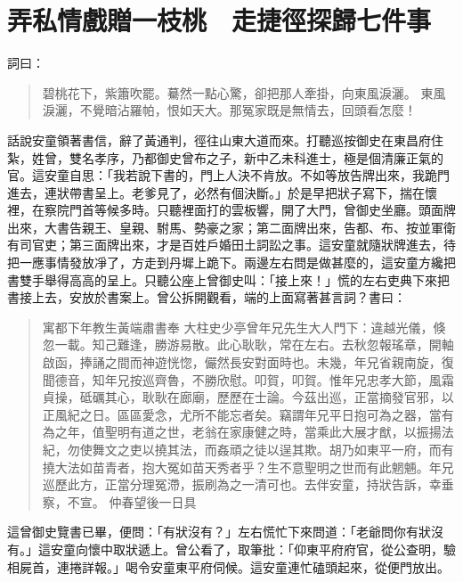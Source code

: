
\chapter{弄私情戲贈一枝桃　走捷徑探歸七件事}

詞曰：
\begin{quote}
碧桃花下，紫簫吹罷。驀然一點心驚，卻把那人牽掛，向東風淚灑。
東風淚灑，不覺暗沾羅帕，恨如天大。那冤家既是無情去，回頭看怎麼！
\end{quote}

話說安童領著書信，辭了黃通判，徑往山東大道而來。打聽巡按御史在東昌府住紮，姓曾，雙名孝序，乃都御史曾布之子，新中乙未科進士，極是個清廉正氣的官。這安童自思：「我若說下書的，門上人決不肯放。不如等放告牌出來，我跪門進去，連狀帶書呈上。老爹見了，必然有個決斷。」於是早把狀子寫下，揣在懷裡，在察院門首等候多時。只聽裡面打的雲板響，開了大門，曾御史坐廳。頭面牌出來，大書告親王、皇親、駙馬、勢豪之家；第二面牌出來，告都、布、按並軍衛有司官吏；第三面牌出來，才是百姓戶婚田土詞訟之事。這安童就隨狀牌進去，待把一應事情發放凈了，方走到丹墀上跪下。兩邊左右問是做甚麼的，這安童方纔把書雙手舉得高高的呈上。只聽公座上曾御史叫：「接上來！」慌的左右吏典下來把書接上去，安放於書案上。曾公拆開觀看，端的上面寫著甚言詞？書曰：
\begin{quote}
寓都下年教生黃端肅書奉
大柱史少亭曾年兄先生大人門下：違越光儀，倏忽一載。知己難逢，勝游易散。此心耿耿，常在左右。去秋忽報瑤章，開軸啟函，捧誦之間而神遊恍惚，儼然長安對面時也。未幾，年兄省親南旋，復聞德音，知年兄按巡齊魯，不勝欣慰。叩賀，叩賀。惟年兄忠孝大節，風霜貞操，砥礪其心，耿耿在廊廟，歷歷在士論。今茲出巡，正當摘發官邪，以正風紀之日。區區愛念，尤所不能忘者矣。竊謂年兄平日抱可為之器，當有為之年，值聖明有道之世，老翁在家康健之時，當乘此大展才猷，以振揚法紀，勿使舞文之吏以撓其法，而姦頑之徒以逞其欺。胡乃如東平一府，而有撓大法如苗青者，抱大冤如苗天秀者乎？生不意聖明之世而有此魍魎。年兄巡歷此方，正當分理冤滯，振刷為之一清可也。去伴安童，持狀告訴，幸垂察，不宣。
仲春望後一日具
\end{quote}

這曾御史覽書已畢，便問：「有狀沒有？」左右慌忙下來問道：「老爺問你有狀沒有。」這安童向懷中取狀遞上。曾公看了，取筆批：「仰東平府府官，從公查明，驗相屍首，連捲詳報。」喝令安童東平府伺候。這安童連忙磕頭起來，從便門放出。

